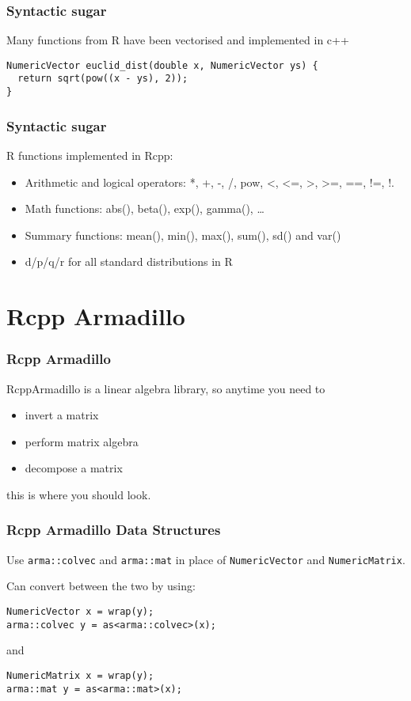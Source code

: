 \documentclass[10pt, compress]{beamer}
\begin{document}
\begin{frame}[fragile]
\frametitle{Syntactic sugar}
Many functions from R have been vectorised and implemented in c++
\begin{Verbatim}[fontsize=\small]
NumericVector euclid_dist(double x, NumericVector ys) {
  return sqrt(pow((x - ys), 2));
}
\end{Verbatim}
\end{frame}
\begin{frame}[fragile]
\frametitle{Syntactic sugar}
R functions implemented in Rcpp:
\begin{itemize}
  \item Arithmetic and logical operators: *, +, -, /, pow, <, <=, >, >=, ==, !=, !. 
  \item Math functions: abs(), beta(), exp(), gamma(), \dots
  \item Summary functions: mean(), min(), max(), sum(), sd() and var()
  \item d/p/q/r for all standard distributions in R
\end{itemize}
\end{frame}
  

\section{Rcpp Armadillo}
\begin{frame}
  \frametitle{Rcpp Armadillo}
  RcppArmadillo is a linear algebra library, so anytime you need to 
  \begin{itemize}
    \item invert a matrix
    \item perform matrix algebra
    \item decompose a matrix
  \end{itemize}
  this is where you should look.
\end{frame}

\begin{frame}[fragile]
\frametitle{Rcpp Armadillo Data Structures}
Use \texttt{arma::colvec} and \texttt{arma::mat} in place of \texttt{NumericVector} and \texttt{NumericMatrix}. 

Can convert between the two by using:
\begin{Verbatim}[fontsize=\small]
NumericVector x = wrap(y);
arma::colvec y = as<arma::colvec>(x);
\end{Verbatim}
and
\begin{Verbatim}[fontsize=\small]
NumericMatrix x = wrap(y);
arma::mat y = as<arma::mat>(x);
\end{Verbatim}

\end{frame}
\end{document}

